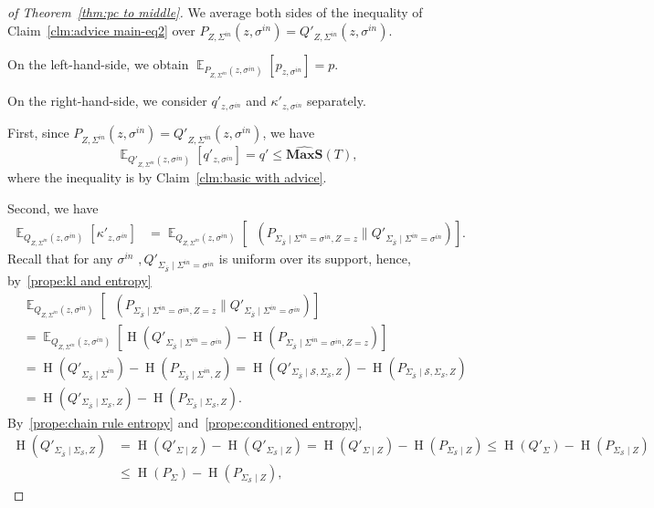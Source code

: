 \documentclass[10pt,a4paper]{amsart}
\DeclareMathOperator*{\E}{\mathbb{E}}
\DeclareMathOperator{\HH}{H}
\DeclareMathOperator{\KL}{D_{\text{KL}}}
\newcommand{\MAXS}{\boldsymbol{MaxS}}
\begin{document}
\begin{proof} [of Theorem~\ref{thm:pc to middle}]
We average both sides of the inequality of Claim~\ref{clm:advice main-eq2} 
over $P_{Z,\Sigma^{in} }(z,\sigma^{in}) = Q'_{Z,\Sigma^{in} }(z,\sigma^{in})$.

On the left-hand-side, we obtain
$
\E_{P_{Z,\Sigma^{in}}(z, \sigma^{in} )}
[p_{z,\sigma^{in} }]
= p$.

On the right-hand-side,
we consider $q'_{z, \sigma^{in}}$ and $\kappa'_{z,\sigma^{in} }$ separately.

First, since
$P_{Z,\Sigma^{in} }(z,\sigma^{in}) = Q'_{Z, \Sigma^{in} }(z,\sigma^{in})$, we have
$$
\E_{Q'_{Z,\Sigma^{in}}(z,\sigma^{in})}[
q'_{z, \sigma^{in}} ] =
q' \leq 
\widehat{\MAXS}(T),$$
where the inequality is by Claim~\ref{clm:basic with advice}.

Second, we have
\begin{align*} 
\E_{Q_{Z,\Sigma^{in}}(z, \sigma^{in} )} [ \kappa'_{z,\sigma^{in} } ] 
&=  
\E_{Q_{Z,\Sigma^{in}}(z, \sigma^{in} )} [ \KL( P_{ \Sigma_{\overline{\mathcal{S}}} \mid \Sigma^{in} = \sigma^{in} , Z = z} \| Q'_{ \Sigma_{ \overline{\mathcal{S}} } \mid \Sigma^{in} = \sigma^{in} } ) ]. 
\end{align*}
Recall that 
for any $\sigma^{in}$
$,
Q'_{ \Sigma_{ \overline{\mathcal{S}} } \mid \Sigma^{in} = \sigma^{in} }$
is uniform 
over its support, hence, by~\ref{prope:kl and entropy}
\begin{align*} 
& \E_{Q_{Z,\Sigma^{in}}(z, \sigma^{in} )} [ \KL( P_{ \Sigma_{\overline{\mathcal{S}}} \mid \Sigma^{in} = \sigma^{in} , Z = z } \| Q'_{ \Sigma_{ \overline{\mathcal{S}} } \mid \Sigma^{in} = \sigma^{in} } ) ] \\
&= 
\E_{Q_{Z,\Sigma^{in}}(z, \sigma^{in} )}[\HH(Q'_{\Sigma_{ \overline{\mathcal{S}} } \mid \Sigma^{in} = \sigma^{in}} ) - 
\HH(P_{ \Sigma_{\overline{\mathcal{S}}} \mid \Sigma^{in} = \sigma^{in} , Z = z } ) ] \\
&= 
\HH(Q'_{\Sigma_{ \overline{\mathcal{S}} } \mid \Sigma^{in}} ) - 
\HH(P_{ \Sigma_{\overline{\mathcal{S}}} \mid \Sigma^{in} , Z} )
= 
\HH(Q'_{\Sigma_{ \overline{\mathcal{S}} } \mid \mathcal{S},\Sigma_{\mathcal{S} },Z } ) - 
\HH(P_{ \Sigma_{\overline{\mathcal{S}}} \mid \mathcal{S},\Sigma_{\mathcal{S} },Z} ) \\
&=
\HH(Q'_{\Sigma_{ \overline{\mathcal{S}} } \mid \Sigma_{\mathcal{S}},Z } ) - 
\HH(P_{ \Sigma_{\overline{\mathcal{S}}} \mid \Sigma_{\mathcal{S}},Z} ).
\end{align*} 
By~\ref{prope:chain rule entropy} and~\ref{prope:conditioned entropy},
\begin{align*} 
\HH(Q'_{\Sigma_{ \overline{\mathcal{S}} } \mid \Sigma_{\mathcal{S}},Z } ) 
&= 
\HH(Q'_{ \Sigma \mid Z} ) - 
\HH(Q'_{ \Sigma_{\mathcal{S}} \mid Z}) = 
\HH(Q'_{ \Sigma \mid Z} ) - 
\HH(P_{ \Sigma_{\mathcal{S}} \mid Z}) \leq
\HH(Q'_{ \Sigma} ) - 
\HH(P_{ \Sigma_{\mathcal{S}} \mid Z}) \\
&\leq 
\HH(P_{ \Sigma} ) - 
\HH(P_{ \Sigma_{\mathcal{S}} \mid Z}),
\end{align*} 


\end{proof}
\end{document}
